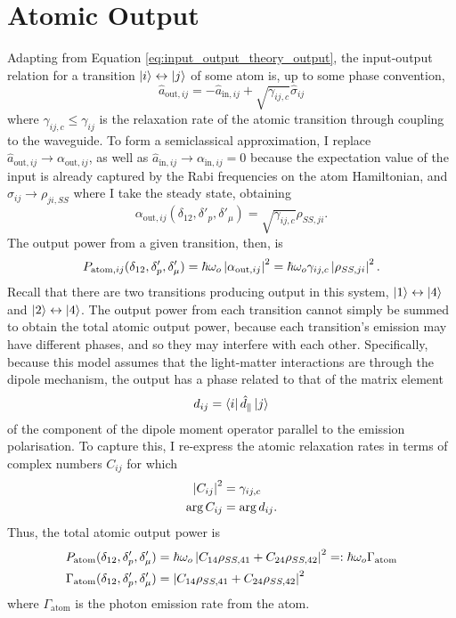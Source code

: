 \section{Atomic Output}
Adapting from Equation \ref{eq:input_output_theory_output}, the input-output relation for a transition $\left|i\right\rangle\leftrightarrow\left|j\right\rangle$ of some atom is, up to some phase convention,
\begin{equation}
    \hat{a}_{\text{out},ij} = -\hat{a}_{\text{in},ij} + \sqrt{\gamma_{ij,c}} \hat{\sigma}_{ij}
\end{equation}
where $\gamma_{ij,c} \leq \gamma_{ij}$ is the relaxation rate of the atomic transition through coupling to the waveguide. To form a semiclassical approximation, I replace $\hat{a}_{\text{out},ij} \to \alpha_{\text{out},ij}$, as well as $\hat{a}_{\text{in},ij} \to \alpha_{\text{in},ij} = 0$ because the expectation value of the input is already captured by the Rabi frequencies on the atom Hamiltonian, and $\hat{\sigma}_{ij} \to \rho_{ji,SS}$ where I take the steady state, obtaining
\begin{equation}
    \alpha_{\text{out},ij}(\delta_{12}, \delta'_p, \delta'_\mu) = \sqrt{\gamma_{ij,c}} \rho_{SS,ji}.
\end{equation}
The output power from a given transition, then, is
\begin{equation}
    P_{\text{atom},ij}(\delta_{12}, \delta'_p, \delta'_\mu) = \hbar\omega_o \left|\alpha_{\text{out},ij}\right|^2 = \hbar\omega_o \gamma_{ij,c}\left|\rho_{SS,ji}\right|^2.
\end{equation}
Recall that there are two transitions producing output in this system, $\left|1\right\rangle\leftrightarrow\left|4\right\rangle$ and $\left|2\right\rangle\leftrightarrow\left|4\right\rangle$. The output power from each transition cannot simply be summed to obtain the total atomic output power, because each transition's emission may have different phases, and so they may interfere with each other. Specifically, because this model assumes that the light-matter interactions are through the dipole mechanism, the output has a phase related to that of the matrix element
\begin{equation}
    d_{ij} = \left\langle i\right|\hat{d}_\parallel\left|j\right\rangle
\end{equation}
of the component of the dipole moment operator parallel to the emission polarisation. To capture this, I re-express the atomic relaxation rates in terms of complex numbers $C_{ij}$ for which
\begin{align}
    \left|C_{ij}\right|^2 &= \gamma_{ij,c} \label{eq:C_ij_magnitude}\\
    \arg C_{ij} &= \arg d_{ij}. \label{eq:C_ij_phase}
\end{align}
Thus, the total atomic output power is
\begin{align}
    P_\text{atom}(\delta_{12}, \delta'_p, \delta'_\mu) &= \hbar\omega_o \left|C_{14}\rho_{SS,41} + C_{24}\rho_{SS,42}\right|^2 =: \hbar\omega_o \Gamma_\text{atom}\\
    \Gamma_\text{atom}(\delta_{12}, \delta'_p, \delta'_\mu) &= \left|C_{14}\rho_{SS,41} + C_{24}\rho_{SS,42}\right|^2
\end{align}
where $\Gamma_\text{atom}$ is the photon emission rate from the atom.

